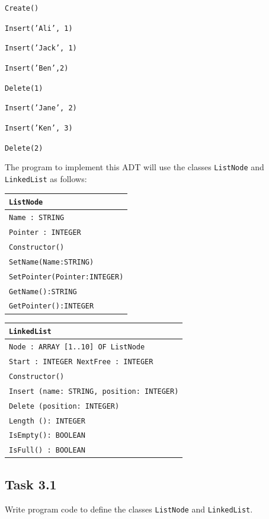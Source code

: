 \noindent\begin{minipage}[t]{1\columnwidth}%
\texttt{Create() }

\texttt{Insert('Ali', 1) }

\texttt{Insert('Jack', 1)}

\texttt{Insert('Ben',2)}

\texttt{Delete(1) }

\texttt{Insert('Jane', 2) }

\texttt{Insert('Ken', 3)}

\texttt{Delete(2)}%
\end{minipage}

The program to implement this ADT will use the classes \texttt{ListNode}
and \texttt{LinkedList} as follows: 
\begin{center}
\begin{tabular}{|l|}
\hline 
\hspace{0.25\columnwidth}\texttt{ListNode}\tabularnewline
\hline 
\texttt{Name : STRING}\tabularnewline
\texttt{Pointer : INTEGER}\tabularnewline
\hline 
\texttt{Constructor()}\tabularnewline
\texttt{SetName(Name:STRING)}\tabularnewline
\texttt{SetPointer(Pointer:INTEGER)}\tabularnewline
\texttt{GetName():STRING}\tabularnewline
\texttt{GetPointer():INTEGER}\tabularnewline
\hline 
\end{tabular}
\par\end{center}

\begin{center}
\begin{tabular}{|l|}
\hline 
\hspace{0.25\columnwidth}\texttt{LinkedList}\tabularnewline
\hline 
\texttt{Node : ARRAY {[}1..10{]} OF ListNode}\tabularnewline
\texttt{Start : INTEGER NextFree : INTEGER}\tabularnewline
\hline 
\texttt{Constructor()}\tabularnewline
\texttt{Insert (name: STRING, position: INTEGER)}\tabularnewline
\texttt{Delete (position: INTEGER)}\tabularnewline
\texttt{Length (): INTEGER}\tabularnewline
\texttt{IsEmpty(): BOOLEAN}\tabularnewline
\texttt{IsFull() : BOOLEAN}\tabularnewline
\hline 
\end{tabular}
\par\end{center}

\subsection*{Task 3.1 }

Write program code to define the classes \texttt{ListNode} and \texttt{LinkedList}. 

